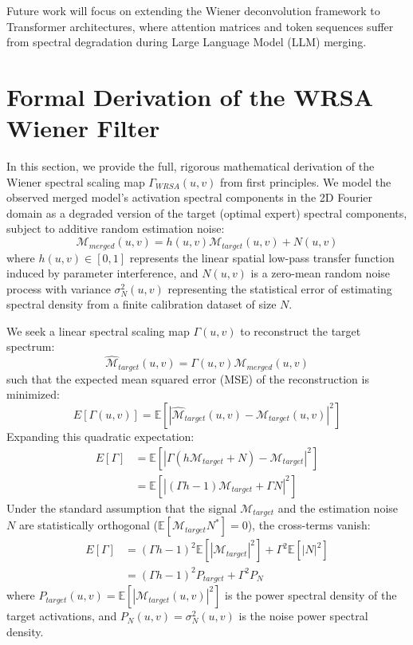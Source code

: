 \documentclass{article}
\theoremstyle{plain}
\theoremstyle{definition}
\theoremstyle{remark}
\begin{document}
Future work will focus on extending the Wiener deconvolution framework to Transformer architectures, where attention matrices and token sequences suffer from spectral degradation during Large Language Model (LLM) merging.

\nocite{*}



\newpage
\appendix
\onecolumn

\section{Formal Derivation of the WRSA Wiener Filter}
\label{app:wiener_derivation}
In this section, we provide the full, rigorous mathematical derivation of the Wiener spectral scaling map $\Gamma_{WRSA}(u, v)$ from first principles.
We model the observed merged model's activation spectral components in the 2D Fourier domain as a degraded version of the target (optimal expert) spectral components, subject to additive random estimation noise:
\begin{equation}
  \mathcal{M}_{merged}(u, v) = h(u, v) \mathcal{M}_{target}(u, v) + N(u, v)
\end{equation}
where $h(u, v) \in [0, 1]$ represents the linear spatial low-pass transfer function induced by parameter interference, and $N(u, v)$ is a zero-mean random noise process with variance $\sigma_N^2(u, v)$ representing the statistical error of estimating spectral density from a finite calibration dataset of size $N$.

We seek a linear spectral scaling map $\Gamma(u, v)$ to reconstruct the target spectrum:
\begin{equation}
  \hat{\mathcal{M}}_{target}(u, v) = \Gamma(u, v) \mathcal{M}_{merged}(u, v)
\end{equation}
such that the expected mean squared error (MSE) of the reconstruction is minimized:
\begin{equation}
  E[\Gamma(u, v)] = \mathbb{E} \left[ \left| \hat{\mathcal{M}}_{target}(u, v) - \mathcal{M}_{target}(u, v) \right|^2 \right]
\end{equation}
Expanding this quadratic expectation:
\begin{align*}
  E[\Gamma] &= \mathbb{E} \left[ \left| \Gamma (h \mathcal{M}_{target} + N) - \mathcal{M}_{target} \right|^2 \right] \\
  &= \mathbb{E} \left[ \left| (\Gamma h - 1) \mathcal{M}_{target} + \Gamma N \right|^2 \right]
\end{align*}
Under the standard assumption that the signal $\mathcal{M}_{target}$ and the estimation noise $N$ are statistically orthogonal ($\mathbb{E}[\mathcal{M}_{target} N^*] = 0$), the cross-terms vanish:
\begin{align*}
  E[\Gamma] &= (\Gamma h - 1)^2 \mathbb{E}[|\mathcal{M}_{target}|^2] + \Gamma^2 \mathbb{E}[|N|^2] \\
  &= (\Gamma h - 1)^2 P_{target} + \Gamma^2 P_N
\end{align*}
where $P_{target}(u, v) = \mathbb{E}[|\mathcal{M}_{target}(u, v)|^2]$ is the power spectral density of the target activations, and $P_N(u, v) = \sigma_N^2(u, v)$ is the noise power spectral density.
\end{document}
